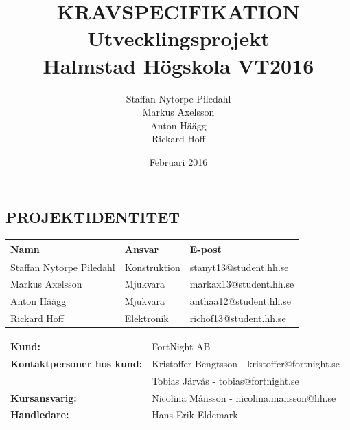 \documentclass{article}
\title{\textbf{KRAVSPECIFIKATION}\\
    \large Utvecklingsprojekt \\
    Halmstad Högskola VT2016}
\author{
Staffan  Nytorpe Piledahl\\
Markus Axelsson\\
Anton Häägg\\
Rickard Hoff}
\date{Februari 2016}
\newcounter{mycounter}
\begin{document}
\setcounter{mycounter}{1}

\maketitle
\thispagestyle{empty}
\newpage
\begin{center}
\chapter{\textbf{\LARGE PROJEKTIDENTITET}}
\end{center}
\vspace{30mm}
\begin{center}
\begin{tabularx}{\textwidth}{| X | X | X |} 
 \hline
 \textbf{Namn} & \textbf{Ansvar} & \textbf{E-post} \\ 
 \hline
 Staffan Nytorpe Piledahl & Konstruktion & stanyt13@student.hh.se\\ 
 Markus Axelsson & Mjukvara & markax13@student.hh.se\\
 Anton Häägg & Mjukvara & anthaa12@student.hh.se\\
 Rickard Hoff & Elektronik & richof13@student.hh.se\\
 \hline
\end{tabularx}

\end{center}
  \begin{tabular}{@{}ll@{}}
    \vspace{2mm}
    \textbf{Kund:} & FortNight AB\\
    \textbf{Kontaktpersoner hos kund:} & Kristoffer Bengtsson - kristoffer@fortnight.se\\
    \vspace{2mm}
    & Tobias Järvås - tobias@fortnight.se\\
    \vspace{2mm}
    \textbf{Kursansvarig:} & Nicolina Månsson - nicolina.mansson@hh.se\\
    \textbf{Handledare:} & Hans-Erik Eldemark
  \end{tabular}
\end{document}
